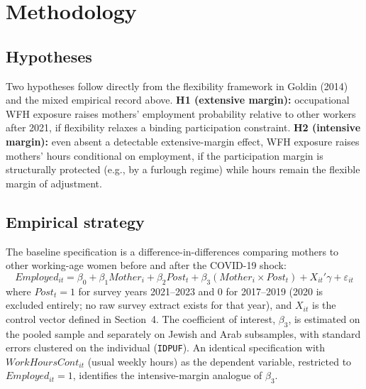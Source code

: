 \documentclass[11pt]{article}
\begin{document}
\section{Methodology}

\subsection{Hypotheses}

Two hypotheses follow directly from the flexibility framework in Goldin (2014) and the mixed empirical record above. \textbf{H1 (extensive margin):} occupational WFH exposure raises mothers' employment probability relative to other workers after 2021, if flexibility relaxes a binding participation constraint. \textbf{H2 (intensive margin):} even absent a detectable extensive-margin effect, WFH exposure raises mothers' hours conditional on employment, if the participation margin is structurally protected (e.g., by a furlough regime) while hours remain the flexible margin of adjustment.

\subsection{Empirical strategy}

The baseline specification is a difference-in-differences comparing mothers to other working-age women before and after the COVID-19 shock:
\begin{equation}
Employed_{it} = \beta_0 + \beta_1 Mother_i + \beta_2 Post_t + \beta_3 (Mother_i \times Post_t) + X_{it}'\gamma + \varepsilon_{it}
\label{eq:baseline}
\end{equation}
where $Post_t=1$ for survey years 2021--2023 and $0$ for 2017--2019 (2020 is excluded entirely; no raw survey extract exists for that year), and $X_{it}$ is the control vector defined in Section~4. The coefficient of interest, $\beta_3$, is estimated on the pooled sample and separately on Jewish and Arab subsamples, with standard errors clustered on the individual (\texttt{IDPUF}). An identical specification with $WorkHoursCont_{it}$ (usual weekly hours) as the dependent variable, restricted to $Employed_{it}=1$, identifies the intensive-margin analogue of $\beta_3$.
\end{document}
